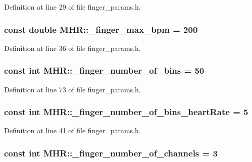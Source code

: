 Definition at line 29 of file finger\+\_\+params.\+h.

\hypertarget{namespace_m_h_r_ae15a1148a0dba9f30071db8315b9fe88}{
\subsubsection[{\+\_\+finger\+\_\+max\+\_\+bpm}]{\setlength{\rightskip}{0pt plus 5cm}const double M\+H\+R\+::\+\_\+finger\+\_\+max\+\_\+bpm = 200}}\label{namespace_m_h_r_ae15a1148a0dba9f30071db8315b9fe88}


Definition at line 36 of file finger\+\_\+params.\+h.

\hypertarget{namespace_m_h_r_a1cd0eaa85c6115e1d53ad1c1a3209b41}{
\subsubsection[{\+\_\+finger\+\_\+number\+\_\+of\+\_\+bins}]{\setlength{\rightskip}{0pt plus 5cm}const int M\+H\+R\+::\+\_\+finger\+\_\+number\+\_\+of\+\_\+bins = 50}}\label{namespace_m_h_r_a1cd0eaa85c6115e1d53ad1c1a3209b41}


Definition at line 73 of file finger\+\_\+params.\+h.

\hypertarget{namespace_m_h_r_a2762706b15a5accb61b7efa79cd0617a}{
\subsubsection[{\+\_\+finger\+\_\+number\+\_\+of\+\_\+bins\+\_\+heart\+Rate}]{\setlength{\rightskip}{0pt plus 5cm}const int M\+H\+R\+::\+\_\+finger\+\_\+number\+\_\+of\+\_\+bins\+\_\+heart\+Rate = 5}}\label{namespace_m_h_r_a2762706b15a5accb61b7efa79cd0617a}


Definition at line 41 of file finger\+\_\+params.\+h.

\hypertarget{namespace_m_h_r_aa01f8308d2cb5cdb00c4a45de8a8cd5e}{
\subsubsection[{\+\_\+finger\+\_\+number\+\_\+of\+\_\+channels}]{\setlength{\rightskip}{0pt plus 5cm}const int M\+H\+R\+::\+\_\+finger\+\_\+number\+\_\+of\+\_\+channels = 3}}\label{namespace_m_h_r_aa01f8308d2cb5cdb00c4a45de8a8cd5e}


